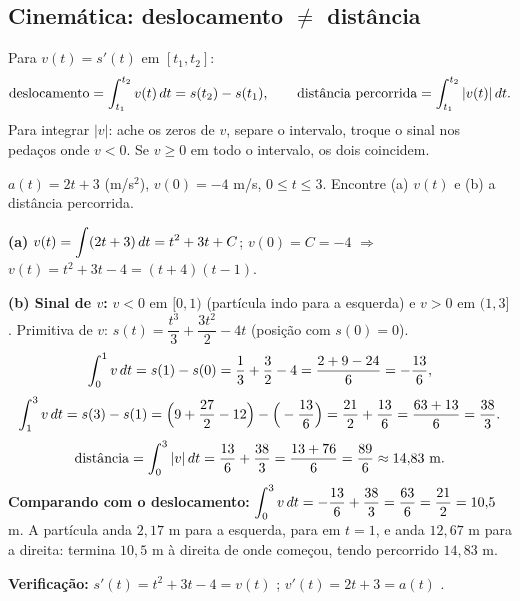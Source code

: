 \subsection{Cinemática: deslocamento $\ne$ distância}

\begin{definicao}
Para $v(t)=s'(t)$ em $[t_1,t_2]$:
\[
\text{deslocamento}=\int_{t_1}^{t_2}v(t)\,dt=s(t_2)-s(t_1),
\qquad
\text{distância percorrida}=\int_{t_1}^{t_2}|v(t)|\,dt .
\]
Para integrar $|v|$: ache os zeros de $v$, separe o intervalo, troque o sinal nos pedaços onde $v<0$. Se $v\ge0$ em todo o intervalo, os dois coincidem.
\begin{center}
\end{center}
\end{definicao}

\begin{exemplo}
$a(t)=2t+3$ (m/s$^2$), $v(0)=-4$ m/s, $0\le t\le3$. Encontre (a) $v(t)$ e (b) a distância percorrida.

\textbf{(a)} $v(t)=\displaystyle\int(2t+3)\,dt=t^2+3t+C$; $v(0)=C=-4$ \;$\Rightarrow$\; $v(t)=t^2+3t-4=(t+4)(t-1)$.

\textbf{(b) Sinal de $v$:} $v<0$ em $[0,1)$ (partícula indo para a esquerda) e $v>0$ em $(1,3]$. Primitiva de $v$: $s(t)=\dfrac{t^3}{3}+\dfrac{3t^2}{2}-4t$ (posição com $s(0)=0$).
\[
\int_0^1 v\,dt=s(1)-s(0)=\frac13+\frac32-4=\frac{2+9-24}{6}=-\frac{13}{6},
\]
\[
\int_1^3 v\,dt=s(3)-s(1)=\Big(9+\frac{27}{2}-12\Big)-\Big(-\frac{13}{6}\Big)=\frac{21}{2}+\frac{13}{6}=\frac{63+13}{6}=\frac{38}{3}.
\]
\[
\text{distância}=\int_0^3|v|\dt=\frac{13}{6}+\frac{38}{3}=\frac{13+76}{6}=\frac{89}{6}\approx14{,}83\ \text{m}.
\]
\textbf{Comparando com o deslocamento:} $\displaystyle\int_0^3 v\,dt=-\frac{13}{6}+\frac{38}{3}=\frac{63}{6}=\frac{21}{2}=10{,}5$ m. A partícula anda $2{,}17$ m para a esquerda, para em $t=1$, e anda $12{,}67$ m para a direita: termina $10{,}5$ m à direita de onde começou, tendo percorrido $14{,}83$ m.

\textbf{Verificação:} $s'(t)=t^2+3t-4=v(t)$ \ok; $v'(t)=2t+3=a(t)$ \ok.
\end{exemplo}

